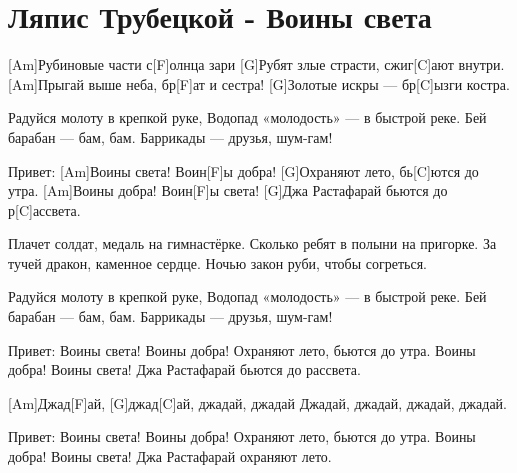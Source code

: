 \section{Ляпис Трубецкой - Воины света}
\begin{guitar}

[Am]Рубиновые части с[F]олнца зари
[G]Рубят злые страсти, сжиг[C]ают внутри.
[Am]Прыгай выше неба, бр[F]ат и сестра!
[G]Золотые искры — бр[C]ызги костра.

Радуйся молоту в крепкой руке,
Водопад «молодость» — в быстрой реке.
Бей барабан — бам, бам.
Баррикады — друзья, шум-гам!

Привет:
[Am]Воины света! Воин[F]ы добра!
[G]Охраняют лето, бь[C]ются до утра.
[Am]Воины добра! Воин[F]ы света!
[G]Джа Растафарай бьются до р[C]ассвета.

Плачет солдат, медаль на гимнастёрке.
Сколько ребят в полыни на пригорке.
За тучей дракон, каменное сердце.
Ночью закон руби, чтобы согреться.

Радуйся молоту в крепкой руке,
Водопад «молодость» — в быстрой реке.
Бей барабан — бам, бам.
Баррикады — друзья, шум-гам!

Привет:
Воины света! Воины добра!
Охраняют лето, бьются до утра.
Воины добра! Воины света!
Джа Растафарай бьются до рассвета.

[Am]Джад[F]ай, [G]джад[C]ай, джадай, джадай
Джадай, джадай, джадай, джадай.

Привет:
Воины света! Воины добра!
Охраняют лето, бьются до утра.
Воины добра! Воины света!
Джа Растафарай охраняют лето.
\end{guitar}